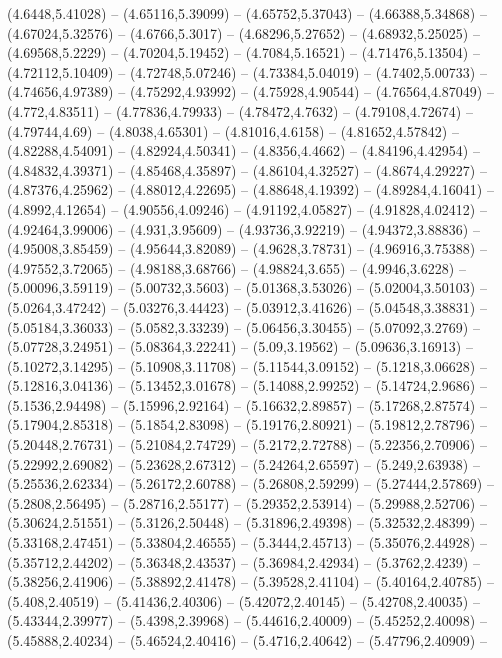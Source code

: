 {(4.6448,5.41028) -- (4.65116,5.39099) -- (4.65752,5.37043) -- (4.66388,5.34868) -- (4.67024,5.32576) -- (4.6766,5.3017) -- (4.68296,5.27652) -- (4.68932,5.25025) -- (4.69568,5.2229) -- (4.70204,5.19452) -- (4.7084,5.16521) -- (4.71476,5.13504) --
(4.72112,5.10409) -- (4.72748,5.07246) -- (4.73384,5.04019) -- (4.7402,5.00733) -- (4.74656,4.97389) -- (4.75292,4.93992) -- (4.75928,4.90544) -- (4.76564,4.87049) -- (4.772,4.83511) -- (4.77836,4.79933) -- (4.78472,4.7632) -- (4.79108,4.72674) --
(4.79744,4.69) -- (4.8038,4.65301) -- (4.81016,4.6158) -- (4.81652,4.57842) -- (4.82288,4.54091) -- (4.82924,4.50341) -- (4.8356,4.4662) -- (4.84196,4.42954) -- (4.84832,4.39371) -- (4.85468,4.35897) -- (4.86104,4.32527) -- (4.8674,4.29227) --
(4.87376,4.25962) -- (4.88012,4.22695) -- (4.88648,4.19392) -- (4.89284,4.16041) -- (4.8992,4.12654) -- (4.90556,4.09246) -- (4.91192,4.05827) -- (4.91828,4.02412) -- (4.92464,3.99006) -- (4.931,3.95609) -- (4.93736,3.92219) -- (4.94372,3.88836) --
(4.95008,3.85459) -- (4.95644,3.82089) -- (4.9628,3.78731) -- (4.96916,3.75388) -- (4.97552,3.72065) -- (4.98188,3.68766) -- (4.98824,3.655) -- (4.9946,3.6228) -- (5.00096,3.59119) -- (5.00732,3.5603) -- (5.01368,3.53026) -- (5.02004,3.50103) --
(5.0264,3.47242) -- (5.03276,3.44423) -- (5.03912,3.41626) -- (5.04548,3.38831) -- (5.05184,3.36033) -- (5.0582,3.33239) -- (5.06456,3.30455) -- (5.07092,3.2769) -- (5.07728,3.24951) -- (5.08364,3.22241) -- (5.09,3.19562) -- (5.09636,3.16913) --
(5.10272,3.14295) -- (5.10908,3.11708) -- (5.11544,3.09152) -- (5.1218,3.06628) -- (5.12816,3.04136) -- (5.13452,3.01678) -- (5.14088,2.99252) -- (5.14724,2.9686) -- (5.1536,2.94498) -- (5.15996,2.92164) -- (5.16632,2.89857) -- (5.17268,2.87574) --
(5.17904,2.85318) -- (5.1854,2.83098) -- (5.19176,2.80921) -- (5.19812,2.78796) -- (5.20448,2.76731) -- (5.21084,2.74729) -- (5.2172,2.72788) -- (5.22356,2.70906) -- (5.22992,2.69082) -- (5.23628,2.67312) -- (5.24264,2.65597) -- (5.249,2.63938) --
(5.25536,2.62334) -- (5.26172,2.60788) -- (5.26808,2.59299) -- (5.27444,2.57869) -- (5.2808,2.56495) -- (5.28716,2.55177) -- (5.29352,2.53914) -- (5.29988,2.52706) -- (5.30624,2.51551) -- (5.3126,2.50448) -- (5.31896,2.49398) -- (5.32532,2.48399) --
(5.33168,2.47451) -- (5.33804,2.46555) -- (5.3444,2.45713) -- (5.35076,2.44928) -- (5.35712,2.44202) -- (5.36348,2.43537) -- (5.36984,2.42934) -- (5.3762,2.4239) -- (5.38256,2.41906) -- (5.38892,2.41478) -- (5.39528,2.41104) -- (5.40164,2.40785) --
(5.408,2.40519) -- (5.41436,2.40306) -- (5.42072,2.40145) -- (5.42708,2.40035) -- (5.43344,2.39977) -- (5.4398,2.39968) -- (5.44616,2.40009) -- (5.45252,2.40098) -- (5.45888,2.40234) -- (5.46524,2.40416) -- (5.4716,2.40642) -- (5.47796,2.40909) --
}
